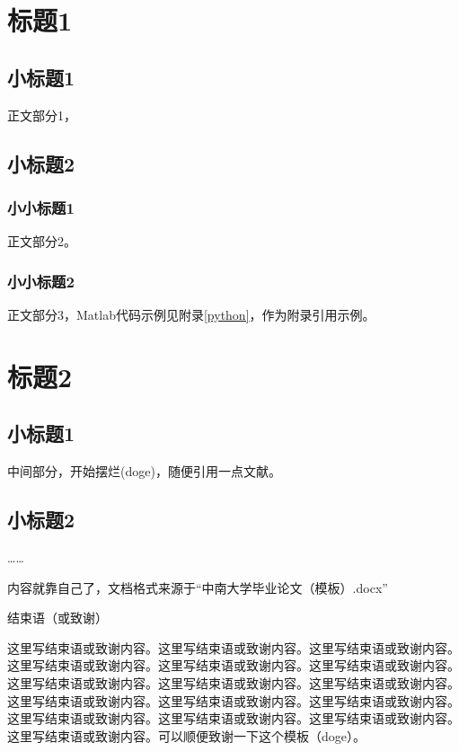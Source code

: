 \newpage\vspace*{-21.6pt}

\section{标题1}
\subsection{小标题1}
正文部分1，
\subsection{小标题2}
\subsubsection{小小标题1}
正文部分2。
\subsubsection{小小标题2}
正文部分3，Matlab代码示例见附录\ref{python}，作为附录引用示例。
\newpage
\section{标题2}
\subsection{小标题1}
中间部分，开始摆烂(doge)，随便引用一点文献\cite{IOTJA}。
\subsection{小标题2}
……

内容就靠自己了，文档格式来源于“中南大学毕业论文（模板）.docx”

\newpage
\begin{center}
	\heiti
	结束语（或致谢）
\end{center}

这里写结束语或致谢内容。这里写结束语或致谢内容。这里写结束语或致谢内容。这里写结束语或致谢内容。这里写结束语或致谢内容。这里写结束语或致谢内容。这里写结束语或致谢内容。这里写结束语或致谢内容。这里写结束语或致谢内容。这里写结束语或致谢内容。这里写结束语或致谢内容。这里写结束语或致谢内容。这里写结束语或致谢内容。这里写结束语或致谢内容。这里写结束语或致谢内容。这里写结束语或致谢内容。可以顺便致谢一下这个模板（doge）。